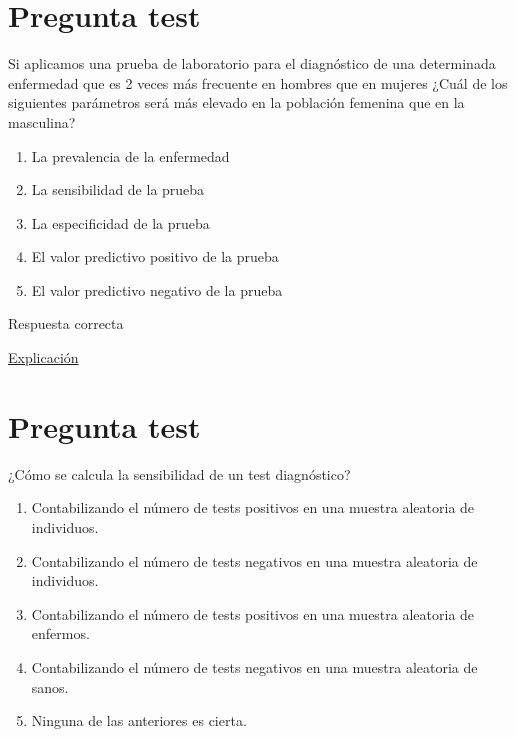 \documentclass[
]{book}
\providecommand{\tightlist}{%
  \setlength{\itemsep}{0pt}\setlength{\parskip}{0pt}}
\begin{document}
\hypertarget{pregunta-test-146}{%
\section{Pregunta test}\label{pregunta-test-146}}

Si aplicamos una prueba de laboratorio para el diagnóstico de una determinada enfermedad que es 2 veces más frecuente en hombres que en mujeres ¿Cuál de los siguientes parámetros será más elevado en la población femenina que en la masculina?

\begin{enumerate}
\def\labelenumi{\alph{enumi})}
\tightlist
\item
  La prevalencia de la enfermedad
\item
  La sensibilidad de la prueba
\item
  La especificidad de la prueba
\item
  El valor predictivo positivo de la prueba
\item
  El valor predictivo negativo de la prueba
\end{enumerate}

Respuesta correcta

\href{https://1fjmanzano.github.io/bioestadistica/relaci\%C3\%B3n-entre-variables-cualitativas.html\#diagno\%CC\%81stico-cli\%CC\%81nico}{Explicación}

\hypertarget{pregunta-test-147}{%
\section{Pregunta test}\label{pregunta-test-147}}

¿Cómo se calcula la sensibilidad de un test diagnóstico?

\begin{enumerate}
\def\labelenumi{\alph{enumi})}
\tightlist
\item
  Contabilizando el número de tests positivos en una muestra aleatoria de individuos.
\item
  Contabilizando el número de tests negativos en una muestra aleatoria de individuos.
\item
  Contabilizando el número de tests positivos en una muestra aleatoria de enfermos.
\item
  Contabilizando el número de tests negativos en una muestra aleatoria de sanos.
\item
  Ninguna de las anteriores es cierta.
\end{enumerate}
\end{document}
